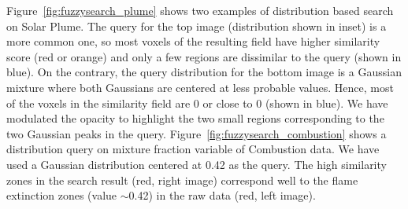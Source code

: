 Figure~\ref{fig:fuzzysearch_plume} shows two examples of distribution based search on Solar Plume. The query for the top image (distribution shown in inset) is a more common one, so most voxels of the resulting field have higher similarity score (red or orange) and only a few regions are dissimilar to the query (shown in blue). On the contrary, the query distribution for the bottom image is a Gaussian mixture where both Gaussians are centered at less probable values. Hence, most of the voxels in the similarity field are 0 or close to 0 (shown in blue). We have modulated the opacity to highlight the two small regions corresponding to the two Gaussian peaks in the query. Figure~\ref{fig:fuzzysearch_combustion} shows a distribution query on mixture fraction variable of Combustion data. We have used a Gaussian distribution centered at 0.42 as the query. The high similarity zones in the search result (red, right image) correspond well to the flame extinction zones (value $\sim$0.42) in the raw data (red, left image).


